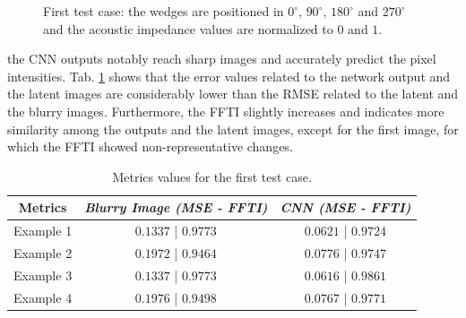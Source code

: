 \documentclass[conference]{IEEEtran}
\begin{document}
\begin{figure}[!t]
{\label{fig_second_case_cnn}}
\caption{First test case: the wedges are positioned in 
$0^{\circ}$, $90^{\circ}$, $180^{\circ}$ and $270^{\circ}$ and the acoustic impedance values are normalized to $0$ and $1$.}
\label{fig_scenario1}
\end{figure}
the CNN outputs notably reach sharp images and accurately
predict the pixel intensities. Tab. \ref{table_caso_1} shows that the error values related to the network output and the latent images are considerably lower than the RMSE related to the latent and the blurry images. Furthermore, the FFTI slightly increases and indicates more similarity among the outputs
and the latent images, except for the first image, for which the FFTI showed non-representative changes.
\begin{table}[!t]
\renewcommand{\arraystretch}{1.2}
\caption{Metrics values for the first test case.}
\label{table_caso_1}
\centering
\begin{tabular}{|c||c||c|}
\hline
 \textbf{Metrics} & \textbf{\textit{Blurry Image (MSE - FFTI)}} & \textbf{\textit{CNN (MSE - FFTI)}}\\
\hline
Example 1 & $0.1337$ | $0.9773$ & $0.0621$ | $0.9724$\\
\hline
Example 2 & $0.1972$ | $0.9464$ & $0.0776$ | $0.9747$\\
\hline
Example 3 & $0.1337$ | $0.9773$ & $0.0616$ | $0.9861$\\
\hline
Example 4 & $0.1976$ | $0.9498$ & $0.0767$ | $0.9771$\\
\hline
\end{tabular}
\end{table}
\end{document}
